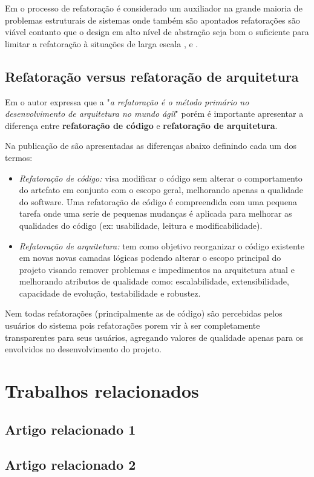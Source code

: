 Em \cite{babar2013agile} o processo de refatoração é considerado um auxiliador na grande maioria de problemas estruturais de sistemas onde também são apontados refatorações são viável contanto que o design em alto nível de abstração seja bom o suficiente para limitar a refatoração à situações de larga escala \cite{ihme2005agile}, \cite{kruchten2008situated} e \cite{boehm2002get}.

\subsection{Refatoração versus refatoração de arquitetura}

Em \cite{thapparambil2005agile} o autor expressa que a "\textit{a refatoração é o método primário no desenvolvimento de arquitetura no mundo ágil}" porém é importante apresentar a diferença entre \textbf{refatoração de código} e \textbf{refatoração de arquitetura}.

Na publicação de \cite{codevsarefactor} são apresentadas as diferenças abaixo definindo cada um dos termos:

\begin{itemize}
    \item \textit{Refatoração de código:} visa modificar o código sem alterar o comportamento do artefato em conjunto com o escopo geral, melhorando apenas a qualidade do software. Uma refatoração de código é compreendida com uma pequena tarefa onde uma serie de pequenas mudanças é aplicada para melhorar as qualidades do código (ex: usabilidade, leitura e modificabilidade).
    \item \textit{Refatoração de arquitetura:} tem como objetivo reorganizar o código existente em novas novas camadas lógicas podendo alterar o escopo principal do projeto visando remover problemas e impedimentos na arquitetura atual e melhorando atributos de qualidade como: escalabilidade, extensibilidade, capacidade de evolução, testabilidade e robustez. 
\end{itemize}

Nem todas refatorações (principalmente as de código) são percebidas pelos usuários do sistema pois refatorações porem vir à ser completamente transparentes para seus usuários, agregando valores de qualidade apenas para os envolvidos no desenvolvimento do projeto.


\section{Trabalhos relacionados}

\subsection{Artigo relacionado 1}

\subsection{Artigo relacionado 2}